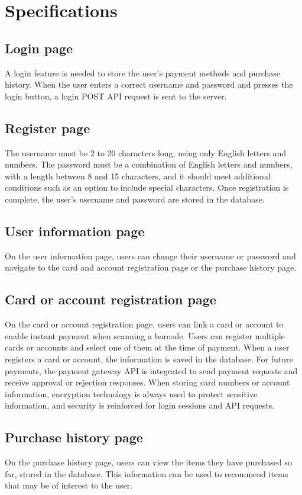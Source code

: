 \documentclass[conference]{IEEEtran}
\begin{document}
\section{Specifications}

\subsection{Login page}
A login feature is needed to store the user’s payment methods and purchase history. When the user enters a correct username and password and presses the login button, a login POST API request is sent to the server. 
 
\subsection{Register page }
The username must be 2 to 20 characters long, using only English letters and numbers. The password must be a combination of English letters and numbers, with a length between 8 and 15 characters, and it should meet additional conditions such as an option to include special characters. Once registration is complete, the user’s username and password are stored in the database. 
 
\subsection{User information page}
On the user information page, users can change their username or password and navigate to the card and account registration page or the purchase history page. 

\subsection{Card or account registration page }

On the card or account registration page, users can link a card or account to enable instant payment when scanning a barcode. Users can register multiple cards or accounts and select one of them at the time of payment. When a user registers a card or account, the information is saved in the database. For future payments, the payment gateway API is integrated to send payment requests and receive approval or rejection responses. When storing card numbers or account information, encryption technology is always used to protect sensitive information, and security is reinforced for login sessions and API requests. 

\subsection{Purchase history page }
On the purchase history page, users can view the items they have purchased so far, stored in the database. This information can be used to recommend items that may be of interest to the user. 
\end{document}
